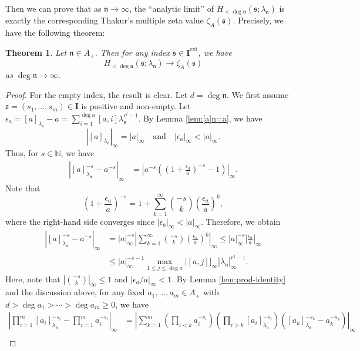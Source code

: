 \documentclass[12pt,reqno]{amsart}
\numberwithin{equation}{section}
\theoremstyle{plain}
\newtheorem{thm}{Theorem}[section]
\theoremstyle{definition}
\theoremstyle{remark}
\newcommand{\NN}{\mathbb{N}}
\newcommand{\nfk}{\mathfrak{n}}
\newcommand{\ww}[1]{\mathfrak{#1}}
\newcommand{\Ical}{\mathbf{I}}
\newcommand{\ext}{\mathrm{ext}}
\begin{document}
Then we can prove that as $\nfk\to\infty$, the ``analytic limit'' of $H_{<\deg\nfk}(\ww{s};\lambda_\nfk)$ is exactly the corresponding Thakur's multiple zeta value $\zeta_A(\ww{s})$. Precisely, we have the following theorem:
\begin{thm}\label{thm:limit of u}
    Let $\nfk\in A_{+}$. Then for any index $\ww{s}\in\Ical^{\ext}$, we have
    $$H_{<\deg\nfk}(\ww{s};\lambda_\nfk)\to \zeta_A(\ww{s})$$
    as $\deg\nfk\to\infty$.
\end{thm}
\begin{proof}
    For the empty index, the result is clear. Let $d=\deg\nfk$. We first assume $\ww{s}=(s_1,\ldots,s_m)\in\Ical$ is positive and non-empty.
    Let $\epsilon_a=[a]_{\lambda_\nfk}-a=\sum_{i=1}^{\deg a}[a,i]\lambda_\nfk^{r^i-1}$. By Lemma \ref{lem:[a]n=a}, we have
    $$\left|[a]_{\lambda_\nfk}\right|_\infty=|a|_\infty\quad
    \text{and}\quad
    \left|\epsilon_a\right|_\infty<|a|_\infty.$$ 
    Thus, for $s\in\NN$, we have
    \begin{align*}
        \left|[a]_{\lambda_\nfk}^{-s}-a^{-s}\right|_\infty&=\left|a^{-s}\left(\left(1+\frac{\epsilon_a}{a}\right)^{-s}-1\right)\right|_\infty.
    \end{align*}
    Note that 
    $$\left(1+\frac{\epsilon_a}{a}\right)^{-s}=1+\sum_{k=1}^\infty \binom{-s}{k}\left(\frac{\epsilon_a}{a}\right)^k,$$
    where the right-hand side converges since $|\epsilon_a|_\infty < |a|_\infty$. Therefore, we obtain
    \begin{align*}
        \left|[a]_{\lambda_\nfk}^{-s}-a^{-s}\right|_\infty&= |a|_\infty^{-s}\left|\sum_{k=1}^\infty \binom{-s}{k}\left(\frac{\epsilon_a}{a}\right)^k\right|_\infty\leq |a|_\infty^{-s}\left|\frac{\epsilon_a}{a}\right|_\infty\\
        &\leq |a|_\infty^{-s-1}\max_{1\leq j\leq \deg a}\left|[a,j]\right|_\infty\left|\lambda_{\nfk}\right|^{r^j-1}_\infty.
    \end{align*}
    Here, note that $\left|\binom{-s}{k}\right|_\infty \leq 1$ and $\left|\epsilon_a/a\right|_\infty<1$.
    By Lemma \ref{lem:prod-identity} and the discussion above, for any fixed $a_1,\ldots,a_m\in A_{+}$ with $d>\deg a_1>\cdots>\deg a_m\geq 0$, we have
    \begin{align*}
        \left|\prod_{i=1}^m[a_i]_{\lambda_\nfk}^{-s_i}-\prod_{i=1}^m a_i^{-s_i}\right|_\infty
        &=\left|\sum_{k=1}^m\left(\prod_{i<k}a_i^{-s_i}\right)\left(\prod_{i>k}[a_i]_{\lambda_\nfk}^{-s_i}\right)\left([a_k]_{\lambda_\nfk}^{-s_k}-a_k^{-s_k}\right)\right|_\infty\\

\end{align*}
\end{proof}
\end{document}
